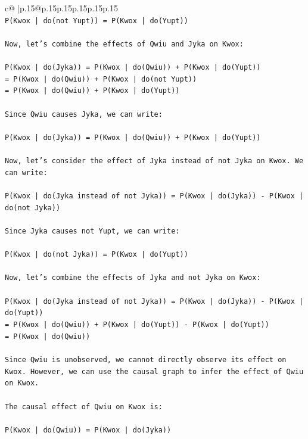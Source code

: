 \documentclass{article}
\begin{document}
{\begin{supertabular}{c@{$\;$}|p{.15\linewidth}@{}p{.15\linewidth}p{.15\linewidth}p{.15\linewidth}p{.15\linewidth}p{.15\linewidth}}
{{{\\ 
\texttt{P(Kwox | do(not Yupt)) = P(Kwox | do(Yupt))} \\
\\ 
\texttt{Now, let's combine the effects of Qwiu and Jyka on Kwox:} \\
\\ 
\texttt{P(Kwox | do(Jyka)) = P(Kwox | do(Qwiu)) + P(Kwox | do(Yupt))} \\
\texttt{= P(Kwox | do(Qwiu)) + P(Kwox | do(not Yupt))} \\
\texttt{= P(Kwox | do(Qwiu)) + P(Kwox | do(Yupt))} \\
\\ 
\texttt{Since Qwiu causes Jyka, we can write:} \\
\\ 
\texttt{P(Kwox | do(Jyka)) = P(Kwox | do(Qwiu)) + P(Kwox | do(Yupt))} \\
\\ 
\texttt{Now, let's consider the effect of Jyka instead of not Jyka on Kwox. We can write:} \\
\\ 
\texttt{P(Kwox | do(Jyka instead of not Jyka)) = P(Kwox | do(Jyka)) {-} P(Kwox | do(not Jyka))} \\
\\ 
\texttt{Since Jyka causes not Yupt, we can write:} \\
\\ 
\texttt{P(Kwox | do(not Jyka)) = P(Kwox | do(Yupt))} \\
\\ 
\texttt{Now, let's combine the effects of Jyka and not Jyka on Kwox:} \\
\\ 
\texttt{P(Kwox | do(Jyka instead of not Jyka)) = P(Kwox | do(Jyka)) {-} P(Kwox | do(Yupt))} \\
\texttt{= P(Kwox | do(Qwiu)) + P(Kwox | do(Yupt)) {-} P(Kwox | do(Yupt))} \\
\texttt{= P(Kwox | do(Qwiu))} \\
\\ 
\texttt{Since Qwiu is unobserved, we cannot directly observe its effect on Kwox. However, we can use the causal graph to infer the effect of Qwiu on Kwox.} \\
\\ 
\texttt{The causal effect of Qwiu on Kwox is:} \\
\\ 
\texttt{P(Kwox | do(Qwiu)) = P(Kwox | do(Jyka))} \\
}}}
\end{supertabular}}
\end{document}
